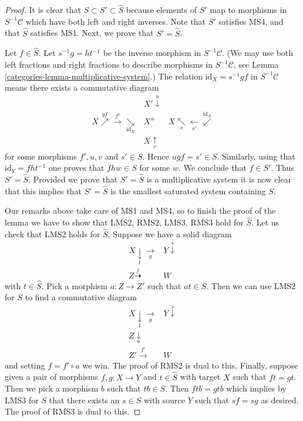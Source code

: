 \begin{proof}

It is clear that $S \subset S' \subset \hat S$ because elements of
$S'$ map to morphisms in $S^{-1}\mathcal{C}$ which have both left
and right inverses. Note that $S'$ satisfies MS4, and that
$\hat S$ satisfies MS1. Next, we prove that $S' = \hat S$.

\medskip\noindent
Let $f \in \hat S$. Let $s^{-1}g = ht^{-1}$ be the inverse morphism
in $S^{-1}\mathcal{C}$. (We may use both left fractions and right
fractions to describe morphisms in $S^{-1}\mathcal{C}$, see
Lemma \ref{categories-lemma-multiplicative-system}.)
The relation $\text{id}_X = s^{-1}gf$ in $S^{-1}\mathcal{C}$ means
there exists a commutative diagram
$$
\begin{array}{ccc} & X' \overset{u}{\downarrow} &  \\ X \overset{gf}{\nearrow}\overset{f'}{\longrightarrow}\underset{\text{id}_X}{\searrow} & X'' & X \underset{s}{\nwarrow}\underset{s'}{\longleftarrow}\overset{\text{id}_X}{\swarrow} \\  & X \underset{v}{\uparrow} & \end{array}
$$
for some morphisms $f', u, v$ and $s' \in S$. Hence $ugf = s' \in S$.
Similarly, using that $\text{id}_Y = fht^{-1}$ one proves that
$fhw \in S$ for some $w$. We conclude that $f \in S'$. Thus
$S' = \hat S$. Provided we prove that $S' = \hat S$ is a
multiplicative system it is now clear that this implies that $S' = \hat S$
is the smallest saturated system containing $S$.

\medskip\noindent
Our remarks above take care of MS1 and MS4, so to finish the proof of the
lemma we have to show that LMS2, RMS2, LMS3, RMS3 hold for $\hat S$.
Let us check that LMS2 holds for $\hat S$. Suppose we have a solid diagram
$$
\begin{array}{cc}X \underset{t}{\downarrow}\underset{g}{\longrightarrow} & Y \overset{s}{\downarrow} \\ Z \overset{f}{\dashrightarrow} & W\end{array}
$$
with $t \in \hat S$. Pick a morphism $a : Z \to Z'$ such that
$at \in S$. Then we can use LMS2 for $S$ to find a commutative diagram
$$
\begin{array}{cc}X \underset{t}{\downarrow}\underset{g}{\longrightarrow} & Y \overset{s}{\downarrow} \\ Z \underset{a}{\downarrow} &  \\ Z' \overset{f'}{\longrightarrow} & W\end{array}
$$
and setting $f = f' \circ a$ we win. The proof of RMS2 is dual to this.
Finally, suppose given a pair of morphisms $f, g : X \to Y$ and
$t \in \hat S$ with target $X$ such that $ft = gt$.
Then we pick a morphism $b$ such that $tb \in S$. Then
$ftb = gtb$ which implies by LMS3 for $S$ that there exists an $s \in S$
with source $Y$ such that $sf = sg$ as desired. The proof of
RMS3 is dual to this.
\end{proof}

